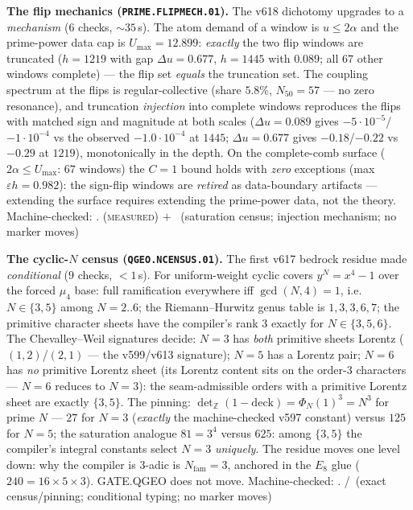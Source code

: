 \documentclass[11pt,a4paper]{article}
\theoremstyle{definition}
\begin{document}
\par\smallskip\noindent\textbf{The flip mechanics
(\texttt{PRIME.FLIPMECH.01}).}
The v618 dichotomy upgrades to a \emph{mechanism} ($6$ checks,
${\sim}35$\,s).  The atom demand of a window is $u\le2\alpha$ and the
prime-power data cap is $U_{\max}=12.899$: \emph{exactly} the two
flip windows are truncated ($h=1219$ with gap $\Delta u=0.677$,
$h=1445$ with $0.089$; all $67$ other windows complete) --- the flip
set \emph{equals} the truncation set.  The coupling spectrum at the
flips is regular-collective (share $5.8\%$, $N_{50}=57$ --- no zero
resonance), and truncation \emph{injection} into complete windows
reproduces the flips with matched sign and magnitude at both scales
($\Delta u=0.089$ gives $-5\cdot10^{-5}$/$-1\cdot10^{-4}$ vs the
observed $-1.0\cdot10^{-4}$ at $1445$; $\Delta u=0.677$ gives
$-0.18$/$-0.22$ vs $-0.29$ at $1219$), monotonically in the depth.
On the complete-comb surface ($2\alpha\le U_{\max}$: $67$ windows)
the $C=1$ bound holds with \emph{zero} exceptions (max
$\varepsilon h=0.982$): the sign-flip windows are \emph{retired} as
data-boundary artifacts --- extending the surface requires extending
the prime-power data, not the theory.
Machine-checked: .
(\textsc{measured}) $+$ \mE\ (saturation census; injection mechanism;
no marker moves)
\par\smallskip

\par\smallskip\noindent\textbf{The cyclic-$N$ census
(\texttt{QGEO.NCENSUS.01}).}
The first v617 bedrock residue made \emph{conditional} ($9$ checks,
${<}1$\,s).  For uniform-weight cyclic covers $y^N=x^4-1$ over the
forced $\mu_4$ base: full ramification everywhere iff
$\gcd(N,4)=1$, i.e.\ $N\in\{3,5\}$ among $N=2..6$; the
Riemann--Hurwitz genus table is $1,3,3,6,7$; the primitive character
sheets have the compiler's rank $3$ exactly for $N\in\{3,5,6\}$.
The Chevalley--Weil signatures decide: $N=3$ has \emph{both}
primitive sheets Lorentz ($(1,2)$/$(2,1)$ --- the v599/v613
signature); $N=5$ has a Lorentz pair; $N=6$ has \emph{no} primitive
Lorentz sheet (its Lorentz content sits on the order-3 characters
--- $N=6$ reduces to $N=3$): the seam-admissible orders with a
primitive Lorentz sheet are exactly $\{3,5\}$.  The pinning:
$\det_{\mathbb Z}(1-\mathrm{deck})=\Phi_N(1)^3=N^3$ for prime $N$
--- $27$ for $N=3$ (\emph{exactly} the machine-checked v597
constant) versus $125$ for $N=5$; the saturation analogue $81=3^4$
versus $625$: among $\{3,5\}$ the compiler's integral constants
select $N=3$ \emph{uniquely}.  The residue moves one level down: why
the compiler is 3-adic is $N_{\mathrm{fam}}=3$, anchored in the
$E_8$ glue ($240=16\times5\times3$).  GATE.QGEO does not move.
Machine-checked: .
\mE/\mC\ (exact census/pinning; conditional typing; no marker moves)
\par\smallskip
\end{document}
